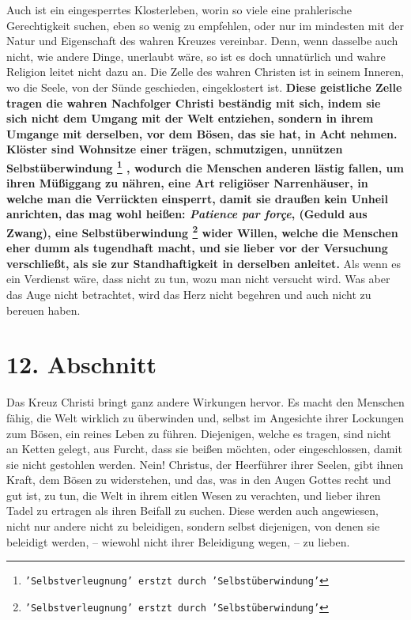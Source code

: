 Auch ist ein eingesperrtes Klosterleben, worin so viele eine
prahlerische
Gerechtigkeit suchen, eben so wenig zu empfehlen, oder nur im mindesten mit der
Natur und Eigenschaft des wahren Kreuzes vereinbar. Denn, wenn dasselbe auch
nicht, wie andere Dinge, unerlaubt wäre, so ist es doch unnatürlich und wahre
Religion leitet nicht dazu an. Die Zelle des wahren Christen ist in seinem
Inneren, wo die Seele, von der Sünde geschieden, eingeklostert ist.
\label{ref:05_11_kloster} \textbf{Diese
geistliche Zelle tragen die wahren Nachfolger Christi beständig mit sich, indem
sie sich nicht dem Umgang mit der Welt entziehen, sondern in ihrem Umgange mit
derselben, vor dem Bösen, das sie hat, in Acht nehmen. Klöster sind Wohnsitze
einer trägen, schmutzigen, unnützen Selbstüberwindung \footnote{\texttt{'Selbstverleugnung' erstzt durch 'Selbstüberwindung'}}
, wodurch die Menschen
anderen lästig fallen, um ihren Müßiggang  zu nähren, eine
Art religiöser Narrenhäuser, in welche man die Verrückten einsperrt, damit sie draußen kein
Unheil anrichten, das mag wohl heißen: \textit{Patience par forçe}, (Geduld aus
Zwang), eine Selbstüberwindung \footnote{\texttt{'Selbstverleugnung' erstzt durch 'Selbstüberwindung'}} wider  Willen, welche die Menschen eher dumm als
tugendhaft macht, und sie lieber vor der Versuchung verschließt, als sie zur
Standhaftigkeit in derselben anleitet.} Als wenn es ein Verdienst wäre, dass nicht
zu tun, wozu man nicht versucht wird. Was aber das Auge nicht betrachtet, wird
das Herz nicht begehren und auch nicht zu bereuen haben.

\section{12. Abschnitt} \label{kap5_ab12}

Das Kreuz Christi bringt ganz andere Wirkungen hervor. Es macht den Menschen
fähig, die Welt wirklich zu überwinden und, selbst im Angesichte ihrer Lockungen
zum Bösen, ein reines Leben zu führen. Diejenigen, welche es tragen, sind nicht
an Ketten gelegt, aus Furcht, dass sie beißen möchten, oder eingeschlossen, damit
sie nicht gestohlen werden. Nein! Christus, der Heerführer ihrer Seelen, gibt
ihnen Kraft, dem Bösen zu widerstehen, und das, was in den Augen Gottes recht
und gut ist, zu tun, die Welt in ihrem eitlen Wesen zu verachten, und lieber
ihren Tadel zu ertragen als ihren Beifall zu suchen.  Diese werden auch
angewiesen, nicht nur andere nicht zu beleidigen, sondern selbst diejenigen, von
denen sie beleidigt werden, -- wiewohl nicht ihrer Beleidigung wegen, -- zu
lieben.


